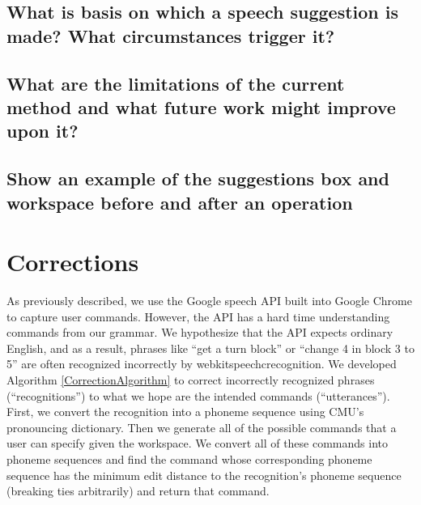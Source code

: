 \documentclass[]{article}
\begin{document}
\subsection{What is basis on which a speech suggestion is made? What circumstances trigger it?}

\subsection{What are the limitations of the current method and what future work might improve upon it?}

\subsection{Show an example of the suggestions box and workspace before and after an operation}

\section{Corrections}

As previously described, we use the Google speech API built into Google Chrome to capture user commands. However, the API has a hard time understanding commands from our grammar. We hypothesize that the API expects ordinary English, and as a result, phrases like ``get a turn block'' or ``change 4 in block 3 to 5'' are often recognized incorrectly by webkitspeechcrecognition. We developed Algorithm \ref{CorrectionAlgorithm} to correct incorrectly recognized phrases (``recognitions'') to what we hope are the intended commands (``utterances''). First, we convert the recognition into a phoneme sequence using CMU's pronouncing dictionary. Then we generate all of the possible commands that a user can specify given the workspace. We convert all of these commands into phoneme sequences and find the command whose corresponding phoneme sequence has the minimum edit distance to the recognition's phoneme sequence (breaking ties arbitrarily) and return that command. 
\end{document}
